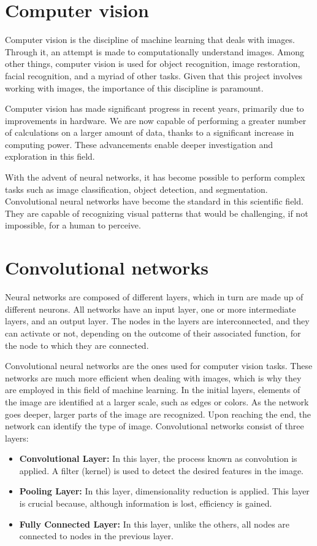 \documentclass[12pt]{report} %
\begin{document}
\section*{Computer vision}

Computer vision is the discipline of machine learning that deals with images. Through it, an attempt is made to computationally understand images. Among other things, computer vision is used for object recognition, image restoration, facial recognition, and a myriad of other tasks. Given that this project involves working with images, the importance of this discipline is paramount.

Computer vision has made significant progress in recent years, primarily due to improvements in hardware. We are now capable of performing a greater number of calculations on a larger amount of data, thanks to a significant increase in computing power. These advancements enable deeper investigation and exploration in this field.

With the advent of neural networks, it has become possible to perform complex tasks such as image classification, object detection, and segmentation. Convolutional neural networks have become the standard in this scientific field. They are capable of recognizing visual patterns that would be challenging, if not impossible, for a human to perceive.
\section*{Convolutional networks}
Neural networks are composed of different layers, which in turn are made up of different neurons. All networks have an input layer, one or more intermediate layers, and an output layer. The nodes in the layers are interconnected, and they can activate or not, depending on the outcome of their associated function, for the node to which they are connected.

Convolutional neural networks are the ones used for computer vision tasks. These networks are much more efficient when dealing with images, which is why they are employed in this field of machine learning. In the initial layers, elements of the image are identified at a larger scale, such as edges or colors. As the network goes deeper, larger parts of the image are recognized. Upon reaching the end, the network can identify the type of image. Convolutional networks consist of three layers:

\begin{itemize}
	\item \textbf{Convolutional Layer:} In this layer, the process known as convolution is applied. A filter (kernel) is used to detect the desired features in the image.
	\item \textbf{Pooling Layer:} In this layer, dimensionality reduction is applied. This layer is crucial because, although information is lost, efficiency is gained.
	\item \textbf{Fully Connected Layer:} In this layer, unlike the others, all nodes are connected to nodes in the previous layer.
\end{itemize}
\end{document}
